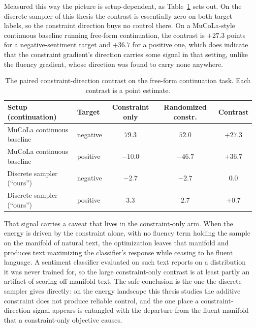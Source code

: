 Measured this way the picture is setup-dependent, as Table~\ref{tab:constrained-contrast} sets out. On the discrete sampler of this thesis the contrast is essentially zero on both target labels, so the constraint direction buys no control there. On a MuCoLa-style continuous baseline running free-form continuation, the contrast is $+27.3$ points for a negative-sentiment target and $+36.7$ for a positive one, which does indicate that the constraint gradient's direction carries some signal in that setting, unlike the fluency gradient, whose direction was found to carry none anywhere.

\begin{table}[htbp]
    \centering
    \small
    \begin{tabular}{llccc}
        \toprule
        Setup (continuation) & Target & Constraint only & Randomized constr. & Contrast \\
        \midrule
        MuCoLa continuous baseline & negative & $79.3$ & $52.0$ & $+27.3$ \\
        MuCoLa continuous baseline & positive & $-10.0$ & $-46.7$ & $+36.7$ \\
        Discrete sampler (``ours'')  & negative & $-2.7$ & $-2.7$ & $0.0$ \\
        Discrete sampler (``ours'')  & positive & $3.3$ & $2.7$ & $+0.7$ \\
        \bottomrule
    \end{tabular}
    \caption[Paired constraint-direction contrast on the continuation task.]{The paired constraint-direction contrast on the free-form continuation task. Each contrast is a point estimate.}
    \label{tab:constrained-contrast}
\end{table}
That signal carries a caveat that lives in the constraint-only arm. When the energy is driven by the constraint alone, with no fluency term holding the sample on the manifold of natural text, the optimization leaves that manifold and produces text maximizing the classifier's response while ceasing to be fluent language. A sentiment classifier evaluated on such text reports on a distribution it was never trained for, so the large constraint-only contrast is at least partly an artifact of scoring off-manifold text. The safe conclusion is the one the discrete sampler gives directly: on the energy landscape this thesis studies the additive constraint does not produce reliable control, and the one place a constraint-direction signal appears is entangled with the departure from the fluent manifold that a constraint-only objective causes.


